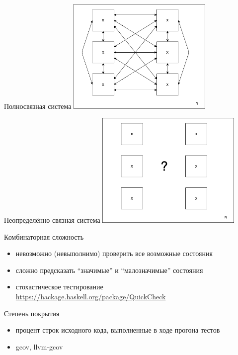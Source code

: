 \documentclass[unknownkeysallowed,xcolor=table]{beamer}
\begin{document}
\begin{frame}{Полносвязная система}
  \includegraphics[align=c,width=7cm,keepaspectratio]{images/unit_testing/interconnected_caption.png}
\end{frame}

\begin{frame}{Неопределённо связная система}
  \includegraphics[align=c,width=7cm,keepaspectratio]{images/unit_testing/unknown.png}
\end{frame}

\begin{frame}{Комбинаторная сложность}
  \begin{itemize}
    \item невозможно (невыполнимо) проверить все возможные состояния \vspace{2em}
    \item сложно предсказать ``значимые'' и ``малозначимые'' состояния \vspace{2em}
    \item стохастическое тестирование \url{https://hackage.haskell.org/package/QuickCheck}
  \end{itemize}
\end{frame}

\begin{frame}{Степень покрытия}
  \begin{itemize}
    \item процент строк исходного кода, выполненные в ходе прогона тестов \vspace{2em}
    \item gcov, llvm-gcov
  \end{itemize}
\end{frame}
\end{document}
